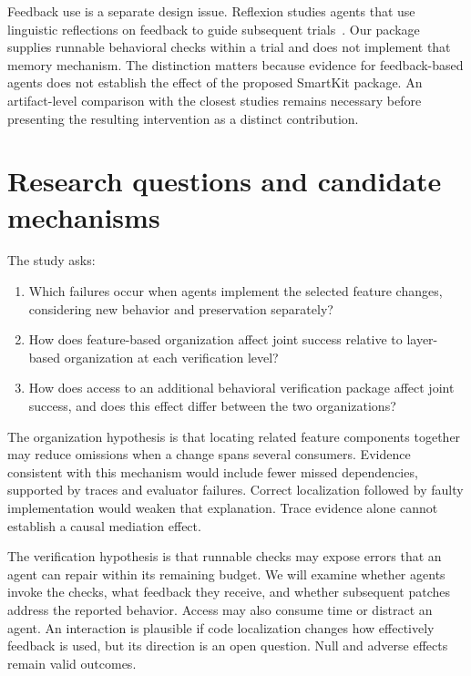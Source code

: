 \documentclass[11pt,a4paper]{article}
\begin{document}
Feedback use is a separate design issue. Reflexion studies agents that use linguistic reflections on feedback to guide subsequent trials~\cite{shinn2023reflexion}. Our package supplies runnable behavioral checks within a trial and does not implement that memory mechanism. The distinction matters because evidence for feedback-based agents does not establish the effect of the proposed SmartKit package. An artifact-level comparison with the closest studies remains necessary before presenting the resulting intervention as a distinct contribution.

\section{Research questions and candidate mechanisms}
The study asks:
\begin{samepage}
\begin{enumerate}
\item[RQ1.] Which failures occur when agents implement the selected feature changes, considering new behavior and preservation separately?
\item[RQ2.] How does feature-based organization affect joint success relative to layer-based organization at each verification level?
\item[RQ3.] How does access to an additional behavioral verification package affect joint success, and does this effect differ between the two organizations?
\end{enumerate}
\end{samepage}

The organization hypothesis is that locating related feature components together may reduce omissions when a change spans several consumers. Evidence consistent with this mechanism would include fewer missed dependencies, supported by traces and evaluator failures. Correct localization followed by faulty implementation would weaken that explanation. Trace evidence alone cannot establish a causal mediation effect.

The verification hypothesis is that runnable checks may expose errors that an agent can repair within its remaining budget. We will examine whether agents invoke the checks, what feedback they receive, and whether subsequent patches address the reported behavior. Access may also consume time or distract an agent. An interaction is plausible if code localization changes how effectively feedback is used, but its direction is an open question. Null and adverse effects remain valid outcomes.
\end{document}
